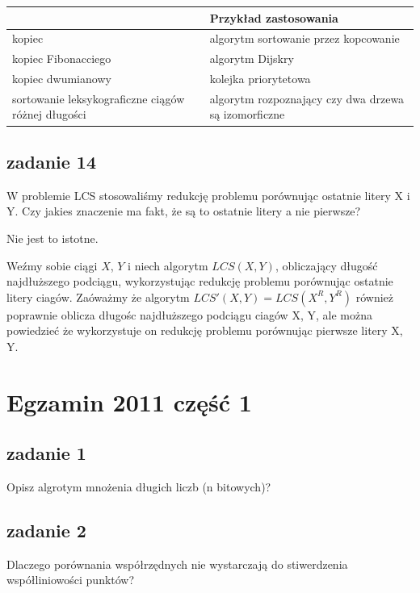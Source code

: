 \documentclass[svgnames]{report}
\begin{document}
\begin{tabular}{l|l}
					&	Przykład zastosowania	\\	\hline
kopiec 				&	algorytm sortowanie przez kopcowanie	\\	\hline
kopiec Fibonacciego &	algorytm Dijskry	\\	\hline
kopiec dwumianowy 	&	kolejka priorytetowa	\\	\hline
sortowanie leksykograficzne ciągów różnej długości & algorytm rozpoznający czy dwa drzewa są izomorficzne	\\	\hline
\end{tabular}


\section{zadanie 14}
\begin{framed}
W problemie LCS stosowaliśmy redukcję problemu porównując ostatnie litery X i Y. Czy jakies znaczenie ma fakt, że są to ostatnie litery a nie pierwsze?
\end{framed}
Nie jest to istotne.

Weźmy sobie ciągi $X$, $Y$ i niech algorytm $LCS(X, Y)$, obliczający długość najdłuższego podciągu, wykorzystując redukcję problemu porównując ostatnie litery ciagów.
Zaóważmy że algorytm $LCS'(X, Y) = LCS(X^R, Y^R)$ również poprawnie oblicza długośc najdłuższego podciągu ciagów X, Y, ale można powiedzieć że wykorzystuje on redukcję problemu porównując pierwsze litery X, Y.


\chapter{Egzamin 2011 część 1}

\section{zadanie 1}
Opisz algrotym mnożenia długich liczb (n bitowych)?

\section{zadanie 2}
Dlaczego porównania współrzędnych nie wystarczają do stiwerdzenia współliniowości punktów?
\end{document}
